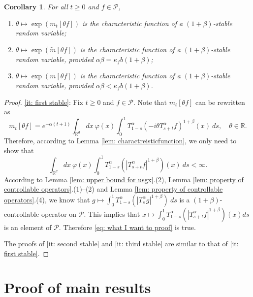 \documentclass[12pt,a4paper]{amsart}
\theoremstyle{plain}
\newtheorem{cor}[thm]{Corollary}
\theoremstyle{definition}
\numberwithin{equation}{section}
\begin{document}
\begin{cor}
\label{cor: alpha stable rv}
	For all $t\geq 0$ and $f\in \mathcal P$,
\begin{enumerate}
\item
\label{it: first stable}
    $\theta \mapsto \exp(m_t[\theta f])$ is the characteristic function of a $(1+\beta)$-stable random variable;
\item
\label{it: second stable}
    $\theta \mapsto \exp(\tilde m[\theta f])$ is the characteristic function of a $(1+\beta)$-stable random variable, provided $\alpha\beta=\kappa_f b(1+\beta)$;
\item
\label{it: third stable}
    $\theta \mapsto \exp(m[\theta f])$ is the characteristic function of a $(1+\beta)$-stable random variable, provided $\alpha\beta < \kappa_f b(1+\beta)$.
\end{enumerate}
\end{cor}
\begin{proof}
    \eqref{it: first stable}:
	Fix $t\geq 0$ and $f\in \mathcal P$.
	Note that $m_t[\theta f]$ can be rewritten as
\[
    m_t[\theta f]= e^{-\alpha (t+1)}\int_{\mathbb R^d} dx~\varphi(x)\int_0^1 T_{1-s}^\alpha (-i\theta T_{s+t}^\alpha f)^{1+\beta}(x)~ds,
    \quad \theta \in \mathbb R.
\]
	Therefore, according to Lemma \ref{lem: charactreisticfunction}, we only need to show that
\begin{equation}
\label{eq: what I want to proof}
	\int_{\mathbb R^d} dx~\varphi(x)\int_0^1 T_{1-s}^\alpha (|T_{s+t}^\alpha f|^{1+\beta})(x)~ds < \infty.
\end{equation}
	According to Lemma \ref{lem: upper bound for usgx}.(2), Lemma \ref{lem: property of controllable operators}.(1)--(2) and Lemma \ref{lem: property of controllable operators}.(4),  we know that
$
	g \mapsto \int_0^1 T_{1-s}^\alpha (|T_{s}^\alpha g|^{1+\beta})~ds
$
	is a $(1+\beta)$-controllable operator on $\mathcal P$.
	This implies that $x \mapsto \int_0^1 T_{1-s}^\alpha (|T_{s+t}^\alpha f|^{1+\beta})(x) ds$ is an element of $\mathcal P$.
	Therefore \eqref{eq: what I want to proof} is true.

    The proofs of \eqref{it: second stable} and \eqref{it: third stable} are similar to that of \eqref{it: first stable}.
\end{proof}


\section{Proof of main results}
\end{document}
